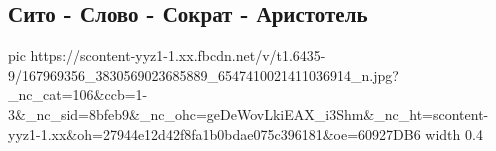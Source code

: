  
 
 
 
 
\subsection{Сито - Слово - Сократ - Аристотель}
\label{sec:03_04_2021.fb.2.sito_hujito_sokrat}

\ifcmt
  pic https://scontent-yyz1-1.xx.fbcdn.net/v/t1.6435-9/167969356_3830569023685889_6547410021411036914_n.jpg?_nc_cat=106&ccb=1-3&_nc_sid=8bfeb9&_nc_ohc=geDeWovLkiEAX_i3Shm&_nc_ht=scontent-yyz1-1.xx&oh=27944e12d42f8fa1b0bdae075c396181&oe=60927DB6
  width 0.4
\fi
